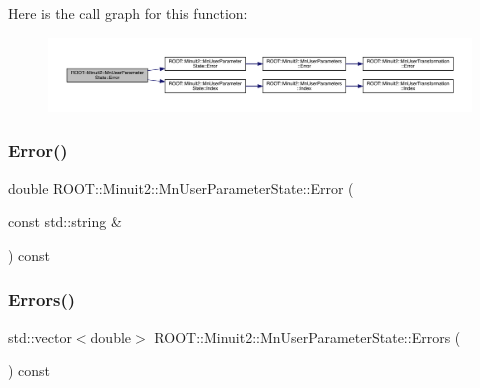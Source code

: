 Here is the call graph for this function\+:\nopagebreak
\begin{figure}[H]
\begin{center}
\leavevmode
\includegraphics[width=350pt]{d3/de0/classROOT_1_1Minuit2_1_1MnUserParameterState_a74ae393362454df2808936090391560f_cgraph}
\end{center}
\end{figure}
\mbox{\label{classROOT_1_1Minuit2_1_1MnUserParameterState_a74ae393362454df2808936090391560f}} 
\subsubsection{\texorpdfstring{Error()}{Error()}\hspace{0.1cm}{\footnotesize\ttfamily [4/4]}}
{\footnotesize\ttfamily double R\+O\+O\+T\+::\+Minuit2\+::\+Mn\+User\+Parameter\+State\+::\+Error (\begin{DoxyParamCaption}\item[{const std\+::string \&}]{ }\end{DoxyParamCaption}) const}

\mbox{\label{classROOT_1_1Minuit2_1_1MnUserParameterState_aa8302ffe35dba71f7a6e0131957ec6e4}} 
\subsubsection{\texorpdfstring{Errors()}{Errors()}\hspace{0.1cm}{\footnotesize\ttfamily [1/2]}}
{\footnotesize\ttfamily std\+::vector$<$double$>$ R\+O\+O\+T\+::\+Minuit2\+::\+Mn\+User\+Parameter\+State\+::\+Errors (\begin{DoxyParamCaption}{ }\end{DoxyParamCaption}) const}


